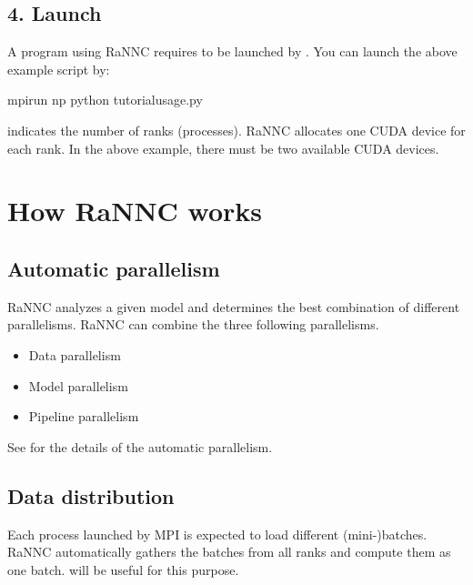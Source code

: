 \documentclass[letterpaper,10pt,english]{sphinxmanual}
\begin{document}
\subsection{4. Launch}
\label{\detokenize{tutorial:launch}}
A program using RaNNC requires to be launched by .
You can launch the above example script by:

\begin{sphinxVerbatim}[commandchars=\\\{\}]
mpirun \PYGZhy{}np  python tutorial\PYGZus{}usage.py
\end{sphinxVerbatim}

 indicates the number of ranks (processes).
RaNNC allocates one CUDA device for each rank.
In the above example, there must be two available CUDA devices.


\section{How RaNNC works}
\label{\detokenize{tutorial:how-rannc-works}}

\subsection{Automatic parallelism}
\label{\detokenize{tutorial:automatic-parallelism}}
RaNNC analyzes a given model and determines the best combination of different parallelisms.
RaNNC can combine the three following parallelisms.
\begin{itemize}
\item {} 
Data parallelism

\item {} 
Model parallelism

\item {} 
Pipeline parallelism

\end{itemize}

See  for the details of the automatic parallelism.


\subsection{Data distribution}
\label{\detokenize{tutorial:data-distribution}}
Each process launched by MPI is expected to load different (mini-)batches. RaNNC automatically gathers the batches from all ranks and compute them as one batch.
 will be useful for this purpose.
\end{document}
